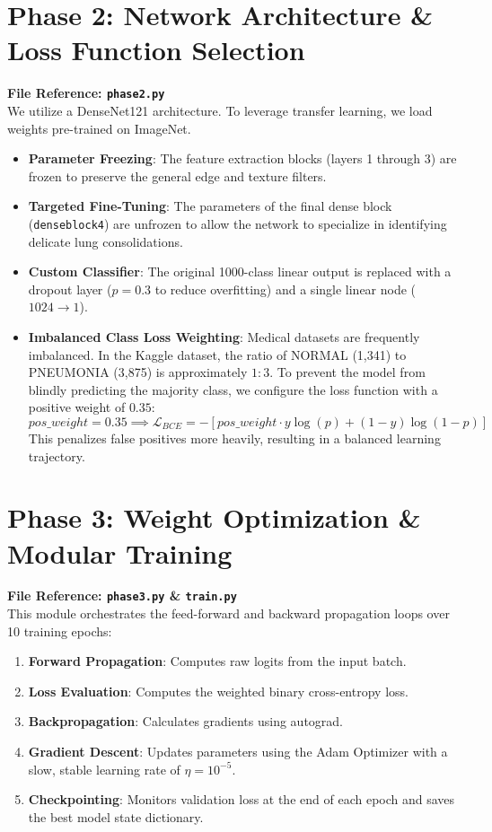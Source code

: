 \documentclass[12pt,oneside]{report}
\begin{document}
\section{Phase 2: Network Architecture \& Loss Function Selection}
\textbf{File Reference: \texttt{phase2.py}} \\
We utilize a DenseNet121 architecture. To leverage transfer learning, we load weights pre-trained on ImageNet.
\begin{itemize}[label=\textbullet]
    \item \textbf{Parameter Freezing}: The feature extraction blocks (layers 1 through 3) are frozen to preserve the general edge and texture filters.
    \item \textbf{Targeted Fine-Tuning}: The parameters of the final dense block (\texttt{denseblock4}) are unfrozen to allow the network to specialize in identifying delicate lung consolidations.
    \item \textbf{Custom Classifier}: The original 1000-class linear output is replaced with a dropout layer ($p=0.3$ to reduce overfitting) and a single linear node ($1024 \to 1$).
    \item \textbf{Imbalanced Class Loss Weighting}: Medical datasets are frequently imbalanced. In the Kaggle dataset, the ratio of NORMAL (1,341) to PNEUMONIA (3,875) is approximately $1:3$. To prevent the model from blindly predicting the majority class, we configure the loss function with a positive weight of $0.35$:
    \begin{equation}
    pos\_weight = 0.35 \implies \mathcal{L}_{BCE} = - [ pos\_weight \cdot y \log(p) + (1-y)\log(1-p) ]
    \end{equation}
    This penalizes false positives more heavily, resulting in a balanced learning trajectory.
\end{itemize}

\section{Phase 3: Weight Optimization \& Modular Training}
\textbf{File Reference: \texttt{phase3.py} \& \texttt{train.py}} \\
This module orchestrates the feed-forward and backward propagation loops over 10 training epochs:
\begin{enumerate}
    \item \textbf{Forward Propagation}: Computes raw logits from the input batch.
    \item \textbf{Loss Evaluation}: Computes the weighted binary cross-entropy loss.
    \item \textbf{Backpropagation}: Calculates gradients using autograd.
    \item \textbf{Gradient Descent}: Updates parameters using the Adam Optimizer with a slow, stable learning rate of $\eta = 10^{-5}$.
    \item \textbf{Checkpointing}: Monitors validation loss at the end of each epoch and saves the best model state dictionary.
\end{enumerate}
\end{document}
